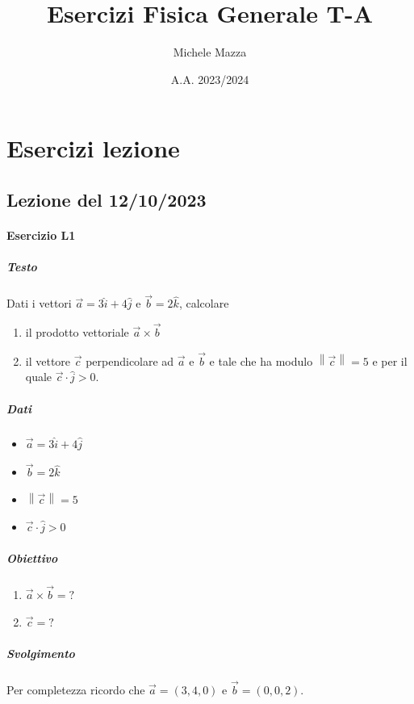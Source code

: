 \documentclass{article}
\newcommand{\norm}[1]{\left\lVert#1\right\rVert}
\begin{document}
\title{Esercizi Fisica Generale T-A}
\author{Michele Mazza}
\date{A.A. 2023/2024}
\maketitle
\tableofcontents
\newpage
\section{Esercizi lezione}
\subsection{Lezione del 12/10/2023}
\paragraph*{Esercizio L1}
\subparagraph*{Testo}
Dati i vettori $\vec{a} = 3\hat{i} +4\hat{j}$ e $\vec{b} = 2\hat{k}$, calcolare
\begin{enumerate}
    \item[(a)] il prodotto vettoriale $\vec{a} \times \vec{b}$
    \item[(b)] il vettore $\vec{c}$ perpendicolare ad $\vec{a}$ e $\vec{b}$ e tale che ha modulo $\norm{\vec{c}} = 5$ e per il quale $\vec{c} \cdot \hat{j} > 0$.
\end{enumerate}
\subparagraph*{Dati}
\begin{itemize}
    \item $\vec{a}                = 3\hat{i} +4\hat{j}$
    \item $\vec{b}                = 2\hat{k}$
    \item $\norm{\vec{c}}         = 5$
    \item $\vec{c} \cdot \hat{j}  > 0$
\end{itemize}
\subparagraph*{Obiettivo}
\begin{enumerate}
    \item[(a)] $\vec{a} \times \vec{b} = ?$
    \item[(b)] $\vec{c}                = ?$
\end{enumerate}
\subparagraph*{Svolgimento}
Per completezza ricordo che $\vec{a} = (3, 4, 0)$ e $\vec{b} = (0, 0, 2)$.
\end{document}
